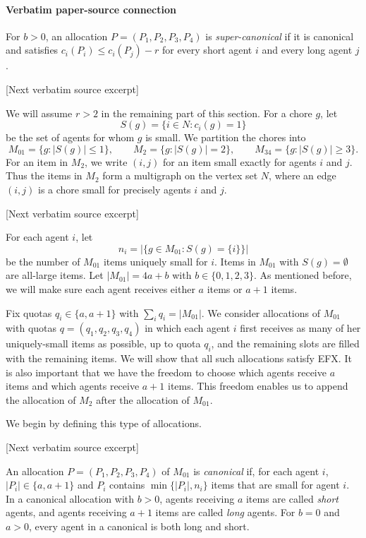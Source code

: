 \documentclass[10pt]{article}
\begin{document}
\paragraph{Verbatim paper-source connection}
\begin{ReviewVerbatim}
For $b>0$, an allocation $P=(P_1,P_2,P_3,P_4)$ is \emph{super-canonical} if it is canonical and satisfies $c_i(P_i)\leq c_i(P_j)-r$ for every short agent $i$ and every long agent $j$.

[Next verbatim source excerpt]

We will assume $r>2$ in the remaining part of this section.
For a chore $g$, let
\[
 S(g)=\{i\in N:c_i(g)=1\}
\]
be the set of agents for whom $g$ is small.  We partition the chores into
\[
M_{01}=\{g:|S(g)|\le 1\},\qquad
M_2=\{g:|S(g)|=2\},\qquad
M_{34}=\{g:|S(g)|\ge 3\}.
\]
For an item in $M_2$, we write $(i,j)$ for an item small exactly for agents
$i$ and $j$.  Thus the items in $M_2$ form a multigraph on the vertex set
$N$, where an edge $(i,j)$ is a chore small for precisely agents $i$ and $j$.

[Next verbatim source excerpt]

For each agent $i$, let
\[
 n_i=\left|\{g\in M_{01}:S(g)=\{i\}\}\right|
\]
be the number of $M_{01}$ items uniquely small for $i$.  Items in $M_{01}$
with $S(g)=\emptyset$ are all-large items.
Let $|M_{01}|=4a+b$ with $b\in\{0,1,2,3\}$.
As mentioned before, we will make sure each agent receives either $a$ items or $a+1$ items.

Fix quotas $q_i\in\{a,a+1\}$ with $\sum_i q_i=|M_{01}|$.
We consider allocations of $M_{01}$ with quotas $q=(q_1,q_2,q_3,q_4)$ in which each agent $i$ first receives as many of her uniquely-small items as possible, up to quota $q_i$, and the remaining slots are filled with the remaining items.
We will show that all such allocations satisfy EFX.
It is also important that we have the freedom to choose which agents receive $a$ items and which agents receive $a+1$ items.
This freedom enables us to append the allocation of $M_2$ after the allocation of $M_{01}$.

We begin by defining this type of allocations.


[Next verbatim source excerpt]

\begin{definition}
    An allocation $P=(P_1,P_2,P_3,P_4)$ of $M_{01}$ is \emph{canonical} if, for each agent $i$, $|P_i|\in\{a,a+1\}$ and $P_i$ contains $\min\{|P_i|, n_i\}$ items that are small for agent $i$.
    In a canonical allocation with $b>0$, agents receiving $a$ items are called \emph{short} agents, and agents receiving $a+1$ items are called \emph{long} agents.
    For $b=0$ and $a>0$, every agent in a canonical is both long and short.


\end{definition}
\end{ReviewVerbatim}
\end{document}
